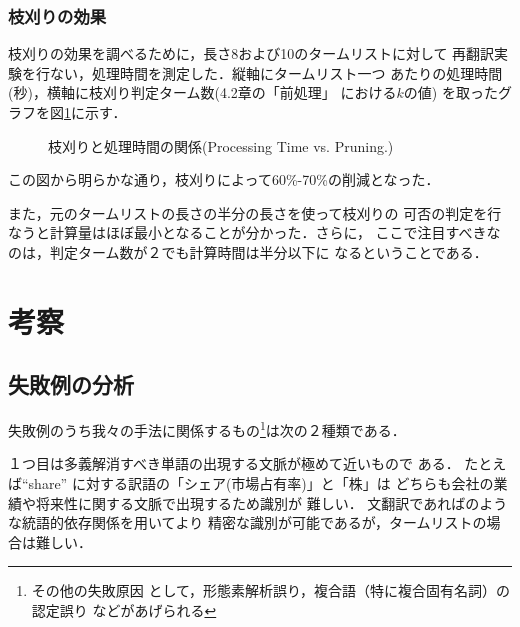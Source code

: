 \begin{figure*}[t]
\begin{center}
\end{center}
\caption{再翻訳精度とタームリスト長の関係(Re-translation results).}
\label{Fig.Retrans}
\end{figure*}


\subsubsection{枝刈りの効果}

枝刈りの効果を調べるために，長さ8および10のタームリストに対して
再翻訳実験を行ない，処理時間を測定した．縦軸にタームリスト一つ
あたりの処理時間(秒)，横軸に枝刈り判定ターム数(4.2章の「前処理」
における$k$の値)
を取ったグラフを図\ref{Fig.Pruning}に示す． 

\begin{figure}
\begin{center}
\end{center}
\caption{枝刈りと処理時間の関係(Processing Time vs. Pruning.)}
\label{Fig.Pruning}
\end{figure}

この図から明らかな通り，枝刈りによって60\%-70\%の削減となった．

また，元のタームリストの長さの半分の長さを使って枝刈りの
可否の判定を行なうと計算量はほぼ最小となることが分かった．さらに，
ここで注目すべきなのは，判定ターム数が２でも計算時間は半分以下に
なるということである．

\section{考察}

\subsection{失敗例の分析}

  失敗例のうち我々の手法に関係するもの\footnote{その他の失敗原因
として，形態素解析誤り，複合語（特に複合固有名詞）の認定誤り
などがあげられる}は次の２種類である．

  １つ目は多義解消すべき単語の出現する文脈が極めて近いもので
ある．
たとえば``share'' に対する訳語の「シェア(市場占有率)」と「株」は
どちらも会社の業績や将来性に関する文脈で出現するため識別が
難しい．
文翻訳であれば\cite{Dagan94}のような統語的依存関係を用いてより
精密な識別が可能であるが，タームリストの場合は難しい． 
  
